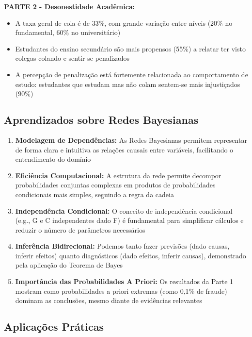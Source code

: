\documentclass[a4paper,12pt]{article}
\begin{document}
\textbf{PARTE 2 - Desonestidade Acadêmica:}
\begin{itemize}
    \item A taxa geral de cola é de 33\%, com grande variação entre níveis (20\% no fundamental, 60\% no universitário)
    \item Estudantes do ensino secundário são mais propensos (55\%) a relatar ter visto colegas colando e sentir-se penalizados
    \item A percepção de penalização está fortemente relacionada ao comportamento de estudo: estudantes que estudam mas não colam sentem-se mais injustiçados (90\%)
\end{itemize}

\subsection{Aprendizados sobre Redes Bayesianas}

\begin{enumerate}
    \item \textbf{Modelagem de Dependências:} As Redes Bayesianas permitem representar de forma clara e intuitiva as relações causais entre variáveis, facilitando o entendimento do domínio

    \item \textbf{Eficiência Computacional:} A estrutura da rede permite decompor probabilidades conjuntas complexas em produtos de probabilidades condicionais mais simples, seguindo a regra da cadeia

    \item \textbf{Independência Condicional:} O conceito de independência condicional (e.g., G e C independentes dado F) é fundamental para simplificar cálculos e reduzir o número de parâmetros necessários

    \item \textbf{Inferência Bidirecional:} Podemos tanto fazer previsões (dado causas, inferir efeitos) quanto diagnósticos (dado efeitos, inferir causas), demonstrado pela aplicação do Teorema de Bayes

    \item \textbf{Importância das Probabilidades A Priori:} Os resultados da Parte 1 mostram como probabilidades a priori extremas (como 0,1\% de fraude) dominam as conclusões, mesmo diante de evidências relevantes
\end{enumerate}

\subsection{Aplicações Práticas}
\end{document}
